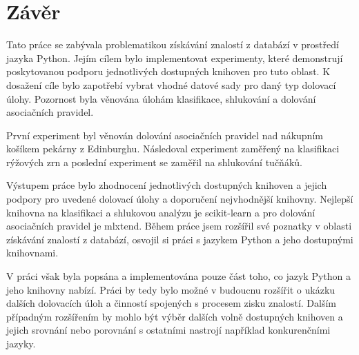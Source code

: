 \chapter{Závěr}
\label{zaver}
Tato práce se zabývala problematikou získávání znalostí z databází v prostředí jazyka Python. Jejím cílem bylo implementovat experimenty, které demonstrují poskytovanou podporu jednotlivých dostupných knihoven pro tuto oblast. K dosažení cíle bylo zapotřebí vybrat vhodné datové sady pro daný typ dolovací úlohy. Pozornost byla věnována úlohám klasifikace, shlukování a dolování asociačních pravidel.

První experiment byl věnován dolování asociačních pravidel nad nákupním košíkem pekárny z Edinburghu. Následoval experiment zaměřený na klasifikaci rýžových zrn a poslední experiment se zaměřil na shlukování tučňáků.

Výstupem práce bylo zhodnocení jednotlivých dostupných knihoven a jejich podpory pro uvedené dolovací úlohy a doporučení nejvhodnější knihovny. Nejlepší knihovna na klasifikaci a shlukovou analýzu je scikit-learn a pro dolování asociačních pravidel je mlxtend. Během práce jsem rozšířil své poznatky v oblasti získávání znalostí z databází, osvojil si práci s jazykem Python a  jeho dostupnými knihovnami. 

V práci však byla popsána a implementována pouze část toho, co jazyk Python a jeho knihovny nabízí. Práci by tedy bylo možné v budoucnu rozšířit o ukázku dalších dolovacích úloh a činností spojených s procesem zisku znalostí. Dalším případným rozšířením by mohlo být výběr dalších volně dostupných knihoven a jejich srovnání nebo porovnání s ostatními nastrojí například konkurenčními jazyky.

